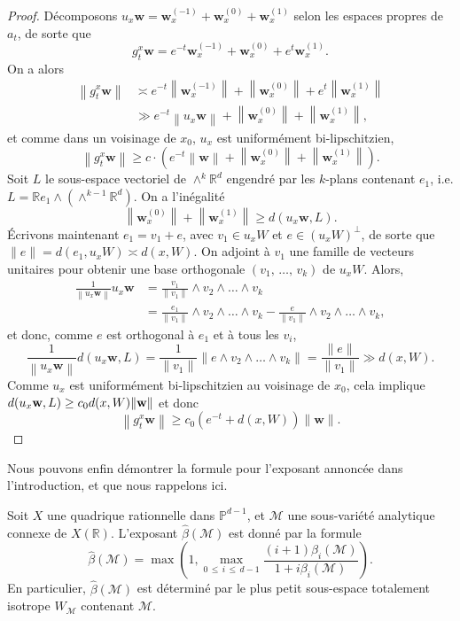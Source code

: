 \documentclass[AHL,Unicode,longabstracts,francais,published]{cedram}
\newcommand{\norm}[1]{\lVert#1\rVert}
\newcommand{\R}{\mathbb{R}}
\newcommand{\PP}{\mathbb{P}}
\newcommand{\bw}{\mathbf{w}}
\newcommand{\cM}{\mathcal{M}}
\newcommand{\bbeta}{\widehat{\beta}}
\begin{document}
\begin{proof}
Décomposons $u_x\bw= \bw_x^{(-1)} + \bw_x^{(0)} + \bw_x^{(1)}$ selon les espaces propres de $a_t$, de sorte que
\[
g_t^x\bw = e^{-t}\bw_x^{(-1)} + \bw_x^{(0)} + e^t \bw_x^{(1)}.
\]
On a alors
\begin{align*}
\left\|g_t^x\bw\right\| & \asymp e^{-t}\left\|\bw_x^{(-1)}\right\| + \left\|\bw_x^{(0)}\right\| + e^t \left\|\bw_x^{(1)}\right\|\\
& \gg e^{-t}\left\|u_x\bw\right\| + \left\|\bw_x^{(0)}\right\| + \left\|\bw_x^{(1)}\right\|,
\end{align*}
et comme dans un voisinage de $x_0$, $u_x$ est uniformément bi-lipschitzien,
\[
\left\|g_t^x\bw\right\| \geq c\cdot\left(e^{-t}\left\|\bw\right\| + \left\|\bw_x^{(0)}\right\|+\left\|\bw_x^{(1)}\right\|\right).
\]
Soit $L$ le sous-espace vectoriel de $\wedge^k\R^d$ engendré par les $k$-plans contenant $e_1$, i.e. $L=\R e_1\wedge(\wedge^{k-1}\R^d)$. On a l'inégalité
\[
\left\|\bw_x^{(0)}\right\|+\left\|\bw_x^{(1)}\right\| \geq d\left(u_x\bw,L\right).
\]
Écrivons maintenant $e_1=v_1+e$, avec $v_1\in u_xW$ et $e\in (u_xW)^\perp$, de sorte que $\|e\|=d(e_1,u_xW)\asymp d(x,W)$. On adjoint à $v_1$ une famille de vecteurs unitaires pour obtenir une base orthogonale $(v_1,\,\dots,\,v_k)$ de $u_xW$. Alors,
\begin{align*}
\frac{1}{\left\|u_x\bw\right\|}u_x\bw & = \frac{v_1}{\|v_1\|}\wedge v_2\wedge\dots\wedge v_k\\
& = \frac{e_1}{\norm{v_1}}\wedge v_2\wedge\dots\wedge v_k - \frac{e}{\|v_1\|}\wedge v_2\wedge\dots\wedge v_k,
\end{align*}
et donc, comme $e$ est orthogonal à $e_1$ et à tous les $v_i$,
\[
\frac{1}{\left\|u_x\bw\right\|}d\left(u_x\bw, L\right) = \frac{1}{\|v_1\|}\|e\wedge v_2\wedge\dots\wedge v_k\| = \frac{\|e\|}{\|v_1\|} \gg d(x,W).
\]
Comme $u_x$ est uniformément bi-lipschitzien au voisinage de $x_0$, cela implique $d(u_x\bw,\linebreak L) \geq c_0 d(x,W)\|\bw\|$ et donc
\[
\left\|g_t^x\bw\right\| \geq c_0\left(e^{-t} + d(x,W)\right)\|\bw\|.
\]
\end{proof}


Nous pouvons enfin démontrer la formule pour l'exposant annoncée dans l'introduction, et que nous rappelons ici.

\begin{theo}\label{formexp}
Soit $X$ une quadrique rationnelle dans $\PP^{d-1}$, et $\cM$ une sous-variété analytique connexe de $X(\R)$. L'exposant $\bbeta(\cM)$ est donné par la formule
\[
\bbeta(\cM) = \max\left(1,\max_{0\,\leq\,i\,\leq\,d-1} \frac{(i+1)\beta_i(\cM)}{1+i\beta_i(\cM)}\right).
\]
En particulier, $\bbeta(\cM)$ est déterminé par le plus petit sous-espace totalement isotrope $W_{\cM}$ contenant $\cM$.
\end{theo}
\end{document}
